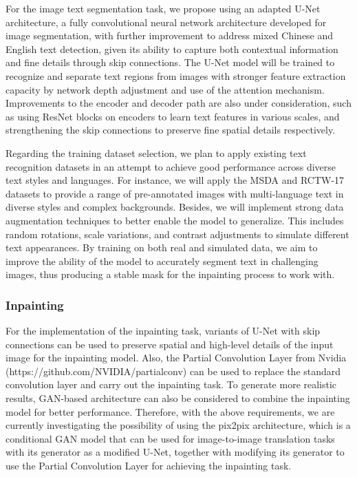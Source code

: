 \documentclass[10pt,twocolumn,letterpaper]{article}
\begin{document}

For the image text segmentation task, we propose using an adapted U-Net architecture, a fully convolutional neural network architecture 
developed for image segmentation, with further improvement to address mixed Chinese and English text detection, given its ability to capture 
both contextual information and fine details through skip connections. 
The U-Net model will be trained to recognize and separate text regions from images with stronger feature extraction capacity by network depth 
adjustment and use of the attention mechanism. Improvements to the encoder and decoder path are also under consideration, 
such as using ResNet blocks on encoders to learn text features in various scales, and strengthening the skip connections to preserve fine spatial details respectively.

Regarding the training dataset selection, we plan to apply existing text recognition datasets in an attempt to achieve good performance 
across diverse text styles and languages. For instance, we will apply the MSDA and RCTW-17 datasets to provide a range of pre-annotated images 
with multi-language text in diverse styles and complex backgrounds. 
Besides, we will implement strong data augmentation techniques to better enable the model to generalize. This includes random rotations, 
scale variations, and contrast adjustments to simulate different text appearances. 
By training on both real and simulated data, we aim to improve the ability of the model to accurately segment text in challenging images, 
thus producing a stable mask for the inpainting process to work with.

\subsubsection{Inpainting}


For the implementation of the inpainting task, variants of U-Net with skip connections can be used to preserve spatial and high-level 
details of the input image for the inpainting model. Also, the Partial Convolution Layer from Nvidia 
(https://github.com/NVIDIA/partialconv) can be used to replace the standard convolution layer and carry out the inpainting task. To 
generate more realistic results, GAN-based architecture can also be considered to combine the inpainting model for better performance.
Therefore, with the above requirements, we are currently investigating the possibility of using the pix2pix architecture,
which is a conditional GAN model that can be used for image-to-image translation tasks with its generator as a modified U-Net, 
together with modifying its generator to use the Partial Convolution Layer for achieving the inpainting task.
\end{document}
